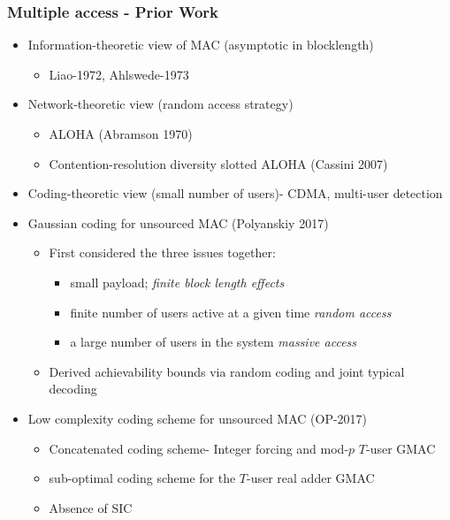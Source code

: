 \documentclass[10pt]{beamer}
\begin{document}
\begin{frame} \frametitle{Multiple access - Prior Work}

\begin{itemize}
   \item Information-theoretic view of MAC (asymptotic in blocklength)
\begin{itemize}
\item  Liao-1972, Ahlswede-1973
\end{itemize}

   \item Network-theoretic view (random access strategy)
	\begin{itemize}
		\item ALOHA (Abramson 1970)
		\item Contention-resolution diversity slotted ALOHA (Cassini 2007)
	\end{itemize}

	\item Coding-theoretic view (small number of users)- CDMA, multi-user detection
	\pause
	\item Gaussian coding for unsourced MAC (Polyanskiy 2017)
	\begin{itemize}
		\item First considered the three issues together: 
		\begin{itemize}
			\item small payload; \emph{finite block length effects}
			\item finite number of users active at a given time \emph{random access}
			\item a large number of users in the system \emph{massive access}
		\end{itemize}
		\item Derived achievability bounds via random coding and joint typical decoding
	\end{itemize}
	
	\item Low complexity coding scheme for unsourced MAC (OP-2017)
	\begin{itemize}
		\item Concatenated coding scheme- Integer forcing and mod-$p$ $T$-user GMAC
		\item sub-optimal coding scheme for the $T$-user real adder GMAC
		\item Absence of SIC
	\end{itemize}
\end{itemize}

\end{frame}
\end{document}
